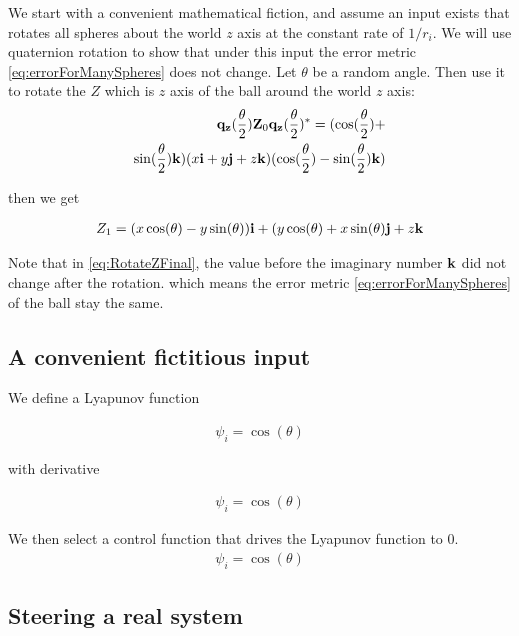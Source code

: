 \documentclass[letter paper, 10pt, conference]{ieeeconf}
\begin{document}
We start with a convenient mathematical fiction, and assume an input exists that rotates all spheres about the world $z$ axis at the constant rate of $1/r_i$.  
We will use quaternion rotation to show that under this input the error metric \eqref{eq:errorForManySpheres} does not change. Let $\theta$ be a random angle. Then use it to rotate the $Z$ which is $z$ axis of the ball around the world $z$ axis:
\begin{align}\nonumber
{\bf q_z}(\frac{\theta}{2}){\bf Z}_0{\bf q_z}(\frac{\theta}{2})^*=(\cos(\frac{\theta}{2})+\\ \sin(\frac{\theta}{2}){\bf k})(x{\bf i}+y{\bf j}+z{\bf k})(\cos(\frac{\theta}{2})-\sin(\frac{\theta}{2}){\bf k})
\end{align}

then we get

\begin{align}
Z_1=(x\cos(\theta)-y\sin(\theta)){\bf i}+(y\cos(\theta)+x\sin(\theta){\bf j}+z{\bf k}
\label{eq:RotateZFinal}
\end{align}

Note that in \eqref{eq:RotateZFinal}, the value before the imaginary number ${\bf k}$ did not change after the rotation. which means the error metric \eqref{eq:errorForManySpheres} of the ball stay the same.

\subsection{A convenient fictitious input}

We define a Lyapunov function

\begin{align}
\psi_i = \cos( \theta) \label{eq:MultipleSphereLyapunov}
\end{align}

with derivative

\begin{align}
\psi_i = \cos( \theta) \label{eq:MultipleSphereLyapunovDerivative}
\end{align}

We then select a control function that drives the Lyapunov function to 0.
\begin{align}
\psi_i = \cos( \theta) \label{eq:ControlLyapunovFunction}
\end{align}

\subsection{Steering a real system}
\end{document}
